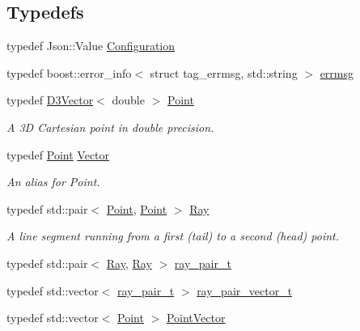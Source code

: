\subsection*{Typedefs}
\begin{DoxyCompactItemize}
\item 
typedef Json\+::\+Value \hyperlink{namespace_wire_cell_a9f705541fc1d46c608b3d32c182333ee}{Configuration}
\item 
typedef boost\+::error\+\_\+info$<$ struct tag\+\_\+errmsg, std\+::string $>$ \hyperlink{namespace_wire_cell_ae6c20ffaec96b23b9655898e20a673f1}{errmsg}
\item 
typedef \hyperlink{class_wire_cell_1_1_d3_vector}{D3\+Vector}$<$ double $>$ \hyperlink{namespace_wire_cell_ab2b2565fa6432efbb4513c14c988cda9}{Point}
\begin{DoxyCompactList}\small\item\em A 3D Cartesian point in double precision. \end{DoxyCompactList}\item 
typedef \hyperlink{namespace_wire_cell_ab2b2565fa6432efbb4513c14c988cda9}{Point} \hyperlink{namespace_wire_cell_aa3c82d3ba85f032b0d278b7004846800}{Vector}
\begin{DoxyCompactList}\small\item\em An alias for Point. \end{DoxyCompactList}\item 
typedef std\+::pair$<$ \hyperlink{namespace_wire_cell_ab2b2565fa6432efbb4513c14c988cda9}{Point}, \hyperlink{namespace_wire_cell_ab2b2565fa6432efbb4513c14c988cda9}{Point} $>$ \hyperlink{namespace_wire_cell_a3ab20d9b438feb7eb1ffaab9ba98af0c}{Ray}
\begin{DoxyCompactList}\small\item\em A line segment running from a first (tail) to a second (head) point. \end{DoxyCompactList}\item 
typedef std\+::pair$<$ \hyperlink{namespace_wire_cell_a3ab20d9b438feb7eb1ffaab9ba98af0c}{Ray}, \hyperlink{namespace_wire_cell_a3ab20d9b438feb7eb1ffaab9ba98af0c}{Ray} $>$ \hyperlink{namespace_wire_cell_a8d74e36d330a8250d92fd4415822c5bc}{ray\+\_\+pair\+\_\+t}
\item 
typedef std\+::vector$<$ \hyperlink{namespace_wire_cell_a8d74e36d330a8250d92fd4415822c5bc}{ray\+\_\+pair\+\_\+t} $>$ \hyperlink{namespace_wire_cell_a15d47ec1e9e43890c5cb09f1e9d77dd3}{ray\+\_\+pair\+\_\+vector\+\_\+t}
\item 
typedef std\+::vector$<$ \hyperlink{namespace_wire_cell_ab2b2565fa6432efbb4513c14c988cda9}{Point} $>$ \hyperlink{namespace_wire_cell_a702d686b1b45c19eed6654d1d5ef8c7b}{Point\+Vector}

\end{DoxyCompactItemize}
